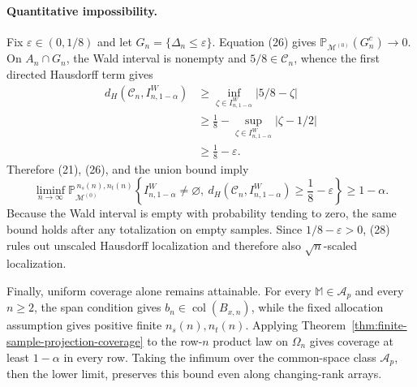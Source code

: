 \paragraph{Quantitative impossibility.}
Fix \(\varepsilon\in(0,1/8)\) and let \(G_n=\{\Delta_n\le\varepsilon\}\). Equation (26) gives \(\mathbb P_{\mathcal M^{(0)}}(G_n^c)\to0\). On \(A_n\cap G_n\), the Wald interval is nonempty and \(5/8\in\mathcal C_n\), whence the first directed Hausdorff term gives
\[
\begin{aligned}
d_H(\mathcal C_n,I^W_{n,1-\alpha})
&\ge\inf_{\zeta\in I^W_{n,1-\alpha}}|5/8-\zeta|\\
&\ge\frac18-\sup_{\zeta\in I^W_{n,1-\alpha}}|\zeta-1/2|\\
&\ge\frac18-\varepsilon.
\end{aligned}
\tag{27}
\]
Therefore (21), (26), and the union bound imply
\[
\liminf_{n\to\infty}
\mathbb P_{\mathcal M^{(0)}}^{\,n_s(n),n_t(n)}
\left\{I^W_{n,1-\alpha}\ne\varnothing,\ 
d_H(\mathcal C_n,I^W_{n,1-\alpha})\ge\frac18-\varepsilon\right\}
\ge1-\alpha.
\tag{28}
\]
Because the Wald interval is empty with probability tending to zero, the same bound holds after any totalization on empty samples. Since \(1/8-\varepsilon>0\), (28) rules out unscaled Hausdorff localization and therefore also \(\sqrt n\)-scaled localization.

Finally, uniform coverage alone remains attainable. For every \(\mathbb M\in\mathcal A_p\) and every \(n\ge2\), the span condition gives \(b_n\in\operatorname{col}(B_{x,n})\), while the fixed allocation assumption gives positive finite \(n_s(n),n_t(n)\). Applying Theorem~\ref{thm:finite-sample-projection-coverage} to the row-\(n\) product law on \(\Omega_n\) gives coverage at least \(1-\alpha\) in every row. Taking the infimum over the common-space class \(\mathcal A_p\), then the lower limit, preserves this bound even along changing-rank arrays.